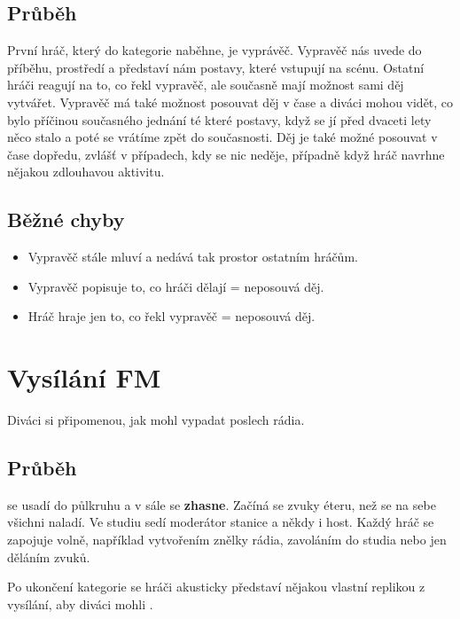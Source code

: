 \subsection{ Průběh } První hráč, který do kategorie naběhne, je vyprávěč. Vypravěč nás uvede do příběhu, prostředí a představí nám postavy, které vstupují na scénu. Ostatní hráči reagují na to, co řekl vypravěč, ale současně mají možnost sami děj vytvářet. Vypravěč má také možnost posouvat děj v čase a diváci mohou vidět, co bylo příčinou současného jednání té které postavy, když se jí před dvaceti lety něco stalo a poté se vrátíme zpět do současnosti. Děj je také možné posouvat v čase dopředu, zvlášť v případech, kdy se nic neděje, případně když hráč navrhne nějakou zdlouhavou aktivitu. 
 
\subsection{ Běžné chyby } \begin{itemize}
\item Vypravěč stále mluví a nedává tak prostor ostatním hráčům.
\item Vypravěč popisuje to, co hráči dělají = neposouvá děj.
\item Hráč hraje jen to, co řekl vypravěč = neposouvá děj.
\end{itemize}
 
 
 
 
 
\needspace{5cm} \section{Vysílání FM} \label{vysílání fm}  
 
 
Diváci  si připomenou, jak mohl vypadat poslech rádia. 
 
 
\subsection{ Průběh }  se usadí do půlkruhu a v sále se \textbf{zhasne}{}. Začíná se zvuky éteru, než se na sebe všichni naladí. Ve studiu sedí moderátor stanice a někdy i host. Každý hráč se zapojuje volně, například vytvořením znělky rádia, zavoláním do studia nebo jen děláním zvuků. 
 
Po ukončení kategorie se hráči akusticky představí nějakou vlastní replikou z vysílání, aby diváci mohli . 
 
